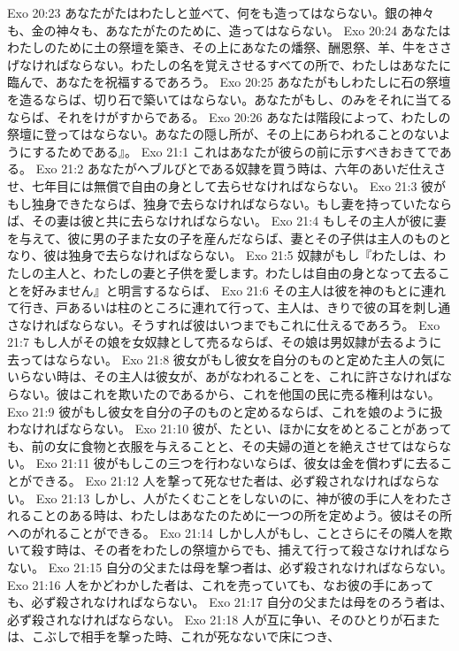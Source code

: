 Exo 20:23  あなたがたはわたしと並べて、何をも造ってはならない。銀の神々も、金の神々も、あなたがたのために、造ってはならない。
Exo 20:24  あなたはわたしのために土の祭壇を築き、その上にあなたの燔祭、酬恩祭、羊、牛をささげなければならない。わたしの名を覚えさせるすべての所で、わたしはあなたに臨んで、あなたを祝福するであろう。
Exo 20:25  あなたがもしわたしに石の祭壇を造るならば、切り石で築いてはならない。あなたがもし、のみをそれに当てるならば、それをけがすからである。
Exo 20:26  あなたは階段によって、わたしの祭壇に登ってはならない。あなたの隠し所が、その上にあらわれることのないようにするためである』。
Exo 21:1  これはあなたが彼らの前に示すべきおきてである。
Exo 21:2  あなたがヘブルびとである奴隷を買う時は、六年のあいだ仕えさせ、七年目には無償で自由の身として去らせなければならない。
Exo 21:3  彼がもし独身できたならば、独身で去らなければならない。もし妻を持っていたならば、その妻は彼と共に去らなければならない。
Exo 21:4  もしその主人が彼に妻を与えて、彼に男の子また女の子を産んだならば、妻とその子供は主人のものとなり、彼は独身で去らなければならない。
Exo 21:5  奴隷がもし『わたしは、わたしの主人と、わたしの妻と子供を愛します。わたしは自由の身となって去ることを好みません』と明言するならば、
Exo 21:6  その主人は彼を神のもとに連れて行き、戸あるいは柱のところに連れて行って、主人は、きりで彼の耳を刺し通さなければならない。そうすれば彼はいつまでもこれに仕えるであろう。
Exo 21:7  もし人がその娘を女奴隷として売るならば、その娘は男奴隷が去るように去ってはならない。
Exo 21:8  彼女がもし彼女を自分のものと定めた主人の気にいらない時は、その主人は彼女が、あがなわれることを、これに許さなければならない。彼はこれを欺いたのであるから、これを他国の民に売る権利はない。
Exo 21:9  彼がもし彼女を自分の子のものと定めるならば、これを娘のように扱わなければならない。
Exo 21:10  彼が、たとい、ほかに女をめとることがあっても、前の女に食物と衣服を与えることと、その夫婦の道とを絶えさせてはならない。
Exo 21:11  彼がもしこの三つを行わないならば、彼女は金を償わずに去ることができる。
Exo 21:12  人を撃って死なせた者は、必ず殺されなければならない。
Exo 21:13  しかし、人がたくむことをしないのに、神が彼の手に人をわたされることのある時は、わたしはあなたのために一つの所を定めよう。彼はその所へのがれることができる。
Exo 21:14  しかし人がもし、ことさらにその隣人を欺いて殺す時は、その者をわたしの祭壇からでも、捕えて行って殺さなければならない。
Exo 21:15  自分の父または母を撃つ者は、必ず殺されなければならない。
Exo 21:16  人をかどわかした者は、これを売っていても、なお彼の手にあっても、必ず殺されなければならない。
Exo 21:17  自分の父または母をのろう者は、必ず殺されなければならない。
Exo 21:18  人が互に争い、そのひとりが石または、こぶしで相手を撃った時、これが死なないで床につき、
